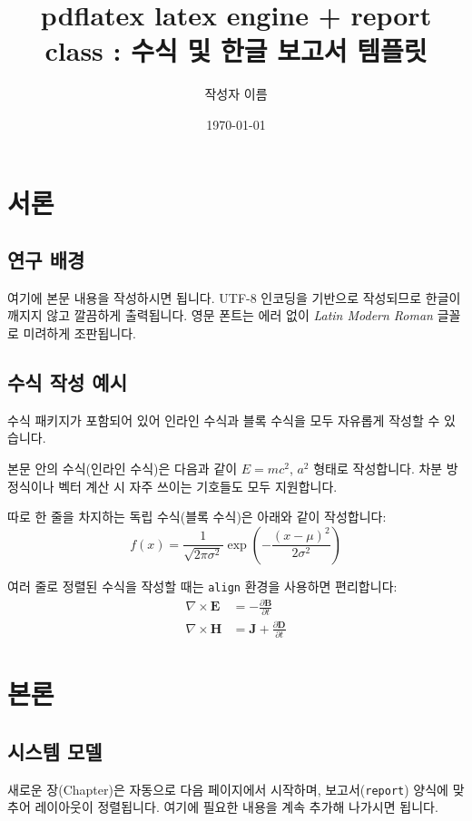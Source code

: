\documentclass[11pt, a4paper]{report}
\title{pdflatex latex engine + report class :  수식 및 한글 보고서 템플릿}
\author{작성자 이름}
\date{\today}
\begin{document}
\maketitle

\tableofcontents
\newpage

\chapter{서론}
\section{연구 배경}
여기에 본문 내용을 작성하시면 됩니다. UTF-8 인코딩을 기반으로 작성되므로 한글이 깨지지 않고 깔끔하게 출력됩니다. 영문 폰트는 에러 없이 \textit{Latin Modern Roman} 글꼴로 미려하게 조판됩니다.

\section{수식 작성 예시}
수식 패키지가 포함되어 있어 인라인 수식과 블록 수식을 모두 자유롭게 작성할 수 있습니다.

본문 안의 수식(인라인 수식)은 다음과 같이 $E = mc^2$, \( a^2 \)  형태로 작성합니다. 차분 방정식이나 벡터 계산 시 자주 쓰이는 기호들도 모두 지원합니다.

따로 한 줄을 차지하는 독립 수식(블록 수식)은 아래와 같이 작성합니다:
\begin{equation}
    f(x) = \frac{1}{\sqrt{2\pi\sigma^2}} \exp\left( -\frac{(x-\mu)^2}{2\sigma^2} \right)
\end{equation}

여러 줄로 정렬된 수식을 작성할 때는 \texttt{align} 환경을 사용하면 편리합니다:
\begin{align}
    \nabla \times \mathbf{E} &= -\frac{\partial \mathbf{B}}{\partial t} \\
    \nabla \times \mathbf{H} &= \mathbf{J} + \frac{\partial \mathbf{D}}{\partial t}
\end{align}


\chapter{본론}
\section{시스템 모델}
새로운 장(Chapter)은 자동으로 다음 페이지에서 시작하며, 보고서(\texttt{report}) 양식에 맞추어 레이아웃이 정렬됩니다. 여기에 필요한 내용을 계속 추가해 나가시면 됩니다.
\end{document}
